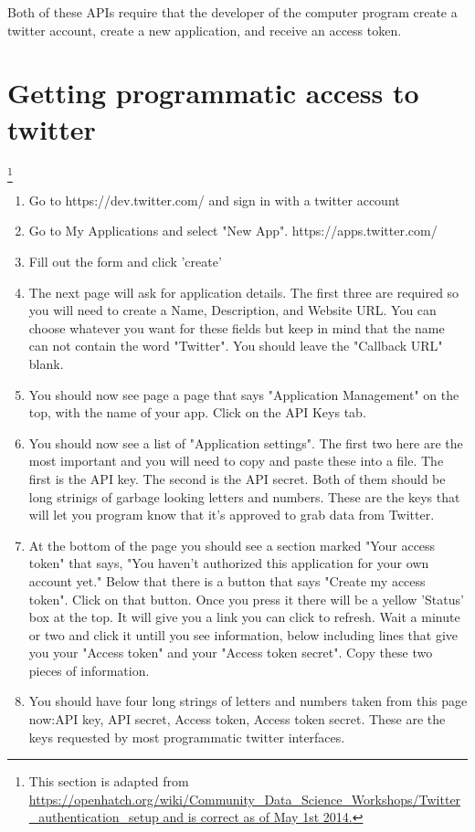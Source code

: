 \documentclass{article}
\begin{document}
Both of these APIs require that the developer of the computer program create a twitter account, create a new application, and receive an access token.

\section*{Getting programmatic access to twitter}\footnote{This section is adapted from \url{https://openhatch.org/wiki/Community_Data_Science_Workshops/Twitter_authentication_setup and is correct as of May 1st 2014.}}
\begin{enumerate}
  \item Go to https://dev.twitter.com/ and sign in with a twitter account
  \item Go to My Applications and select "New App". https://apps.twitter.com/
  \item Fill out the form and click 'create'
  \item The next page will ask for application details. The first three are required so you will need to create a Name, Description, and Website URL. You can choose whatever you want for these fields but keep in mind that the name can not contain the word "Twitter". You should leave the "Callback URL" blank. 
  \item You should now see page a page that says "Application Management" on the top, with the name of your app. Click on the API Keys tab.
  \item You should now see a list of "Application settings". The first two here are the most important and you will need to copy and paste these into a file. The first is the API key. The second is the API secret. Both of them should be long strinigs of garbage looking letters and numbers. These are the keys that will let you program know that it's approved to grab data from Twitter.
  \item At the bottom of the page you should see a section marked "Your access token" that says, "You haven't authorized this application for your own account yet." Below that there is a button that says "Create my access token". Click on that button. Once you press it there will be a yellow 'Status' box at the top. It will give you a link you can click to refresh. Wait a minute or two and click it untill you see information, below including lines that give you your "Access token" and your "Access token secret". Copy these two pieces of information.
  \item You should have four long strings of letters and numbers taken from this page now:API key, API secret, Access token, Access token secret. These are the keys requested by most programmatic twitter interfaces.
\end{enumerate}
\end{document}
